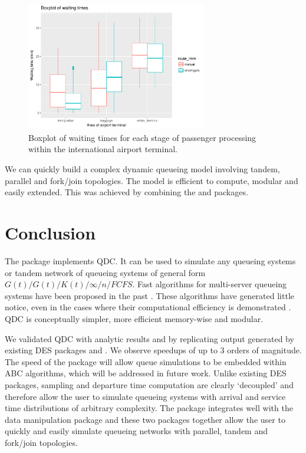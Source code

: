 \documentclass[article]{jss}
\begin{document}
\begin{figure}[!htb]
\centering
\includegraphics[width = 0.7\textwidth]{figures/boxplot_dplyr.pdf}
\caption{Boxplot of waiting times for each stage of passenger processing within the international airport terminal. }
\label{fig:boxplot_dplyr.pdf}
\end{figure}

We can quickly build a complex dynamic queueing model involving tandem, parallel and fork/join topologies. The model is efficient to compute, modular and easily extended. This was achieved by combining the  and  packages. 

\section{Conclusion}

The  package  implements QDC. It can be used to simulate any queueing systems or tandem network of queueing systems of general form $G(t)/G(t)/K(t)/\infty/n/FCFS$. Fast algorithms for multi-server queueing systems have been proposed in the past \citep{krivulin_recursive_1994,sutton_inference_2010,kin_generalized_2010}. These algorithms have generated little notice, even in the cases where their computational efficiency is demonstrated \citep{kin_generalized_2010}. QDC is conceptually simpler, more efficient memory-wise and modular. 

We validated QDC with analytic results and by replicating output generated by existing DES packages  and . We observe speedups of up to 3 orders of magnitude. The speed of the package will allow queue simulations to be embedded within ABC algorithms, which will be addressed in future work. Unlike existing DES packages, sampling and departure time computation are clearly `decoupled' and therefore allow the user to simulate queueing systems with arrival and service time distributions of arbitrary complexity. The package integrates well with the data manipulation package  and these two packages together allow the user to quickly and easily simulate queueing networks with parallel, tandem and fork/join topologies. 
\end{document}
